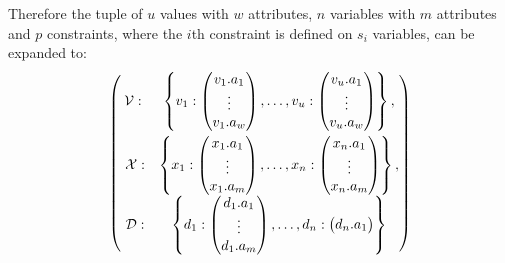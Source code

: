 Therefore the tuple of $u$ values with $w$ attributes, $n$ variables with $m$ attributes and $p$ constraints, where the $i$th constraint is defined on $s_i$ variables, can be expanded to:
\begin{align}
\begin{pmatrix}\vspace{3pt}
\mathcal{V}:&
	\begin{Bmatrix}
		v_1:
		\begin{pmatrix}
			v_1.a_1\\
			\vdots\\
			v_1.a_w\\
		\end{pmatrix}
		, \ldots,
		v_u:
		\begin{pmatrix}
			v_u.a_1\\
			\vdots\\
			v_u.a_w\\
		\end{pmatrix}
	\end{Bmatrix},\\\hspace{3pt}
	\mathcal{X}:&
	\begin{Bmatrix}
		x_1:
		\begin{pmatrix}
			x_1.a_1\\
			\vdots\\
			x_1.a_m\\
		\end{pmatrix}
		, \ldots,
		x_n:
		\begin{pmatrix}
			x_n.a_1\\
			\vdots\\
			x_n.a_m\\
		\end{pmatrix}
	\end{Bmatrix},\\\hspace{3pt}
	\mathcal{D}:&
	\begin{Bmatrix}
		d_1:
		\begin{pmatrix}
			d_1.a_1\\
			\vdots\\
			d_1.a_m\\
		\end{pmatrix}
		, \ldots,
		d_n:
		\begin{pmatrix}
			d_n.a_1\\

\end{pmatrix}
\end{Bmatrix}
\end{pmatrix}
\end{align}
